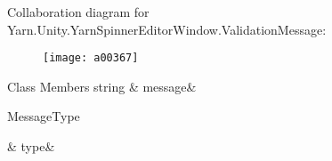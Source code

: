 Collaboration diagram for Yarn.\-Unity.\-Yarn\-Spinner\-Editor\-Window.\-Validation\-Message\-:
\nopagebreak
\begin{figure}[H]
\begin{center}
\leavevmode
\texttt{[image: a00367]}
\end{center}
\end{figure}
\begin{DoxyFields}{Class Members}
\hypertarget{a00176_a636dce6708e779c201fa5e7d01cf2955}{string}\label{a00176_a636dce6708e779c201fa5e7d01cf2955}
&
message&
\\
\hline

\hypertarget{a00176_a7d342190c7657fbbe85eb6fa66bcabb8}{Message\-Type}\label{a00176_a7d342190c7657fbbe85eb6fa66bcabb8}
&
type&
\\
\hline

\end{DoxyFields}
